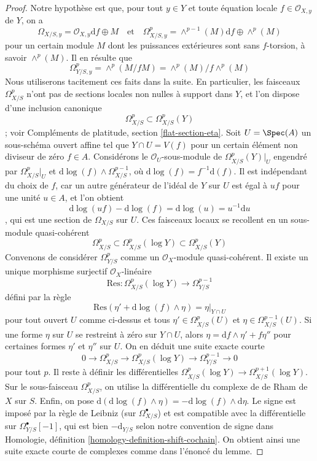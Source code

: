 \begin{proof}
Notre hypothèse est que, pour tout $y \in Y$ et toute équation locale
$f \in \mathcal{O}_{X, y}$ de $Y$, on a
$$
\Omega_{X/S, y} = \mathcal{O}_{X, y}\text{d}f \oplus M
\quad\text{et}\quad
\Omega^p_{X/S, y} = \wedge^{p - 1}(M)\text{d}f \oplus \wedge^p(M)
$$
pour un certain module $M$ dont les puissances extérieures sont sans $f$-torsion, à savoir $\wedge^p(M)$.
Il en résulte que
$$
\Omega^p_{Y/S, y} = \wedge^p(M/fM) = \wedge^p(M)/f\wedge^p(M)
$$
Nous utiliserons tacitement ces faits dans la suite.
En particulier, les faisceaux $\Omega^p_{X/S}$ n'ont pas de sections locales non nulles
à support dans $Y$, et l'on dispose d'une inclusion canonique
$$
\Omega^p_{X/S} \subset \Omega^p_{X/S}(Y)
$$ ;
voir Compléments de platitude, section \ref{flat-section-eta}. Soit $U = \Spec(A)$
un sous-schéma ouvert affine tel que $Y \cap U = V(f)$ pour un certain
élément non diviseur de zéro $f \in A$. Considérons le $\mathcal{O}_U$-sous-module
de $\Omega^p_{X/S}(Y)|_U$ engendré par
$\Omega^p_{X/S}|_U$ et $\text{d}\log(f) \wedge \Omega^{p - 1}_{X/S}$,
où $\text{d}\log(f) = f^{-1}\text{d}(f)$.
Il est indépendant du choix de $f$, car un autre générateur de
l'idéal de $Y$ sur $U$ est égal à $uf$ pour une unité $u \in A$, et l'on obtient
$$
\text{d}\log(uf) - \text{d}\log(f) = \text{d}\log(u) = u^{-1}\text{d}u
$$,
qui est une section de $\Omega_{X/S}$ sur $U$. Ces faisceaux locaux
se recollent en un sous-module quasi-cohérent
$$
\Omega^p_{X/S} \subset \Omega^p_{X/S}(\log Y) \subset \Omega^p_{X/S}(Y)
$$
Convenons de considérer $\Omega^p_{Y/S}$ comme un
$\mathcal{O}_X$-module quasi-cohérent. Il existe un unique morphisme surjectif
$\mathcal{O}_X$-linéaire
$$
\text{Res} : \Omega^p_{X/S}(\log Y) \to \Omega^{p - 1}_{Y/S}
$$
défini par la règle
$$
\text{Res}(\eta' + \text{d}\log(f) \wedge \eta) = \eta|_{Y \cap U}
$$
pour tout ouvert $U$ comme ci-dessus et tous
$\eta' \in \Omega^p_{X/S}(U)$ et $\eta \in \Omega^{p - 1}_{X/S}(U)$.
Si une forme $\eta$ sur $U$ se restreint à zéro sur $Y \cap U$, alors
$\eta = \text{d}f \wedge \eta' + f\eta''$ pour certaines formes $\eta'$ et $\eta''$
sur $U$. On en déduit
une suite exacte courte
$$
0 \to \Omega^p_{X/S} \to \Omega^p_{X/S}(\log Y) \to \Omega^{p - 1}_{Y/S} \to 0
$$
pour tout $p$. Il reste à définir les différentielles
$\Omega^p_{X/S}(\log Y) \to \Omega^{p + 1}_{X/S}(\log Y)$.
Sur le sous-faisceau $\Omega^p_{X/S}$, on utilise la différentielle du
complexe de de Rham de $X$ sur $S$. Enfin, on pose
$\text{d}(\text{d}\log(f) \wedge \eta) = -\text{d}\log(f) \wedge \text{d}\eta$.
Le signe est imposé par la règle de Leibniz (sur $\Omega^\bullet_{X/S}$)
et est compatible avec la différentielle sur $\Omega^\bullet_{Y/S}[-1]$,
qui est bien $-\text{d}_{Y/S}$ selon notre convention de signe dans
Homologie, définition \ref{homology-definition-shift-cochain}.
On obtient ainsi une suite exacte courte
de complexes comme dans l'énoncé du lemme.
\end{proof}

